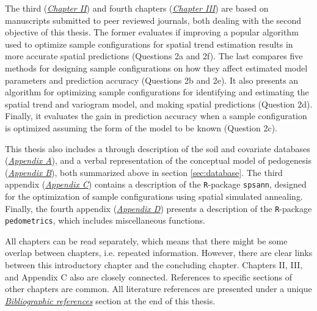 The third (\hyperref[chap:chapter02]{\textit{Chapter II}}) and fourth chapters 
(\hyperref[chap:chapter03]{\textit{Chapter III}}) are based on manuscripts submitted to peer 
reviewed journals, both dealing with the second objective of this thesis. The 
former evaluates if improving a popular algorithm used to optimize sample configurations for spatial
trend estimation results in more accurate spatial predictions (Questions 2a and 2f). The last 
compares five methods for designing sample configurations on how they affect estimated model 
parameters and prediction accuracy (Questions 2b and 2e). It also presents an algorithm for 
optimizing sample configurations for identifying and estimating the spatial trend and variogram 
model, and making spatial predictions (Question 2d). Finally, it evaluates the gain in prediction 
accuracy when a sample configuration is optimized assuming the form of the model to be known 
(Question 2c).

This thesis also includes a through description of the soil and covariate databases
(\hyperref[apen:database]{\textit{Appendix A}}), and a verbal representation of the conceptual model
of pedogenesis (\hyperref[apen:pedogenesis]{\textit{Appendix B}}), both summarized above in section
\ref{sec:database}. The third appendix (\hyperref[apen:spsann]{\textit{Appendix C}})  contains a 
description of the \texttt{R}-package \texttt{spsann}, designed for the optimization of sample 
configurations using spatial simulated annealing. Finally, the fourth appendix 
(\hyperref[apen:pedometrics]{\textit{Appendix D}}) presents a description of the \texttt{R}-package
 \texttt{pedometrics}, which includes miscellaneous functions.

All chapters can be read separately, which means that there might be some overlap between chapters, 
i.e. repeated information. However, there are clear links between this introductory chapter 
and the concluding chapter. Chapters II, III, and Appendix C also are closely connected. References 
to specific sections of other chapters are common. All literature references are presented under a
unique \hyperref[chap:references]{\textit{Bibliographic references}} section at the end of this
thesis.
